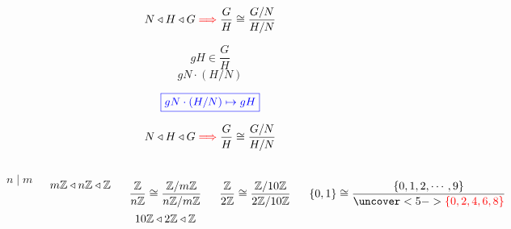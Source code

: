 \begin{frame}
  \begin{theorem}
	\[
	  N \triangleleft H \triangleleft G \textcolor{red}{\implies} \frac{G}{H} \cong \frac{G/N}{H/N}
	\]
  \end{theorem}
  
  \begin{center}
	 \pause
	\[
	  gH \in \frac{G}{H}
	\]
	\pause
	 \pause
	\[
	  gN \cdot (H/N)
	\]
  \end{center}

  \pause
  \vspace{-0.60cm}
  \[
	\textcolor{blue}{\boxed{gN \cdot (H/N) \mapsto gH}}
  \]

  \pause
  \begin{center}
  \end{center}
\end{frame}

\begin{frame}
  \begin{theorem}
	\[
	  N \triangleleft H \triangleleft G \textcolor{red}{\implies} \frac{G}{H} \cong \frac{G/N}{H/N}
	\]
  \end{theorem}

  \vspace{0.60cm}
  \begin{columns}
	  \[
		n \mid m
	  \]

	  \[
		m\mathbb{Z} \triangleleft n\mathbb{Z} \triangleleft \mathbb{Z}
	  \]

	  \pause
	  \[
		\frac{\mathbb{Z}}{n\mathbb{Z}} \cong \frac{\mathbb{Z}/m\mathbb{Z}}{n\mathbb{Z}/m\mathbb{Z}}
	  \]
	  \pause
	  \[
		10\mathbb{Z} \triangleleft 2\mathbb{Z} \triangleleft \mathbb{Z}
	  \]

	  \[
		\frac{\mathbb{Z}}{2\mathbb{Z}} \cong \frac{\mathbb{Z}/10\mathbb{Z}}{2\mathbb{Z}/10\mathbb{Z}}
	  \]

	  \pause
	  \[
		\set{0,1} \cong \frac{\set{0, 1, 2, \cdots, 9}}{\uncover<5->{\red{\set{0, 2, 4, 6, 8}}}}
	  \]
  \end{columns}
\end{frame}

